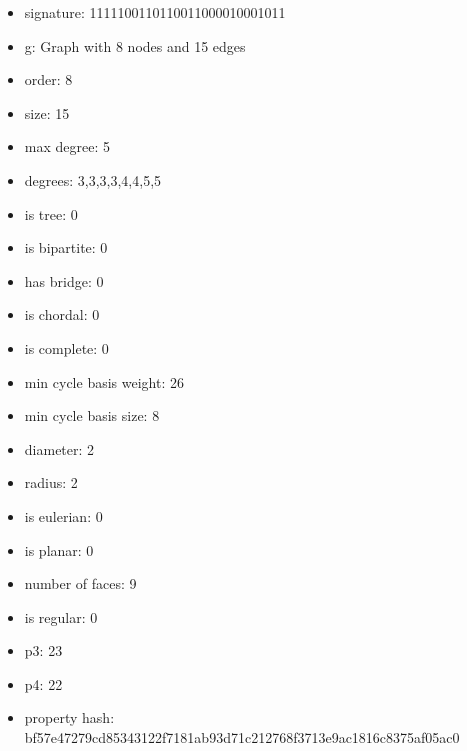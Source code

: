 \begin{itemize}
\item signature: 1111100110110011000010001011
\item g: Graph with 8 nodes and 15 edges
\item order: 8
\item size: 15
\item max degree: 5
\item degrees: 3,3,3,3,4,4,5,5
\item is tree: 0
\item is bipartite: 0
\item has bridge: 0
\item is chordal: 0
\item is complete: 0
\item min cycle basis weight: 26
\item min cycle basis size: 8
\item diameter: 2
\item radius: 2
\item is eulerian: 0
\item is planar: 0
\item number of faces: 9
\item is regular: 0
\item p3: 23
\item p4: 22
\item property hash: bf57e47279cd85343122f7181ab93d71c212768f3713e9ac1816c8375af05ac0
\end{itemize}
\newpage
\begin{figure}
\end{figure}
